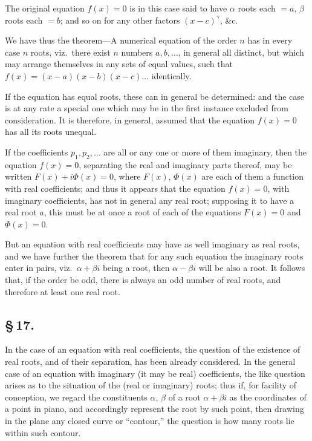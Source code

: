 \documentclass[11pt,a4paper]{article}
\begin{document}
The original equation $f(x) = 0$ is in this case said to have $\alpha$ roots each $=a$, $\beta$ roots each $=b$; and so on for any other factors $(x - c)^{\gamma}$, \&c.

We have thus the theorem---A numerical equation of the order $n$ has in every case $n$ roots, viz.\ there exist $n$ numbers $a, b, \ldots$, in general all distinct, but which may arrange themselves in any sets of equal values, such that $f(x) = (x - a)(x - b)(x - c)\ldots$ identically.

If the equation has equal roots, these can in general be determined: and the case is at any rate a special one which may be in the first instance excluded from consideration. It is therefore, in general, assumed that the equation $f(x) = 0$ has all its roots unequal.

If the coefficients $p_{1}, p_{2}, \ldots$ are all or any one or more of them imaginary, then the equation $f(x) = 0$, separating the real and imaginary parts thereof, may be written $F(x) + i\Phi(x) = 0$, where $F(x)$, $\Phi(x)$ are each of them a function with real coefficients; and thus it appears that the equation $f(x) = 0$, with imaginary coefficients, has not in general any real root; supposing it to have a real root $a$, this must be at once a root of each of the equations $F(x) = 0$ and $\Phi(x) = 0$.

But an equation with real coefficients may have as well imaginary as real roots, and we have further the theorem that for any such equation the imaginary roots enter in pairs, viz.\ $\alpha + \beta i$ being a root, then $\alpha - \beta i$ will be also a root. It follows that, if the order be odd, there is always an odd number of real roots, and therefore at least one real root.

\subsection*{\S\,17.}

In the case of an equation with real coefficients, the question of the existence of real roots, and of their separation, has been already considered. In the general case of an equation with imaginary (it may be real) coefficients, the like question arises as to the situation of the (real or imaginary) roots; thus if, for facility of conception, we regard the constituents $\alpha$, $\beta$ of a root $\alpha + \beta i$ as the coordinates of a point in piano, and accordingly represent the root by such point, then drawing in the plane any closed curve or ``contour,'' the question is how many roots lie within such contour.
\end{document}
